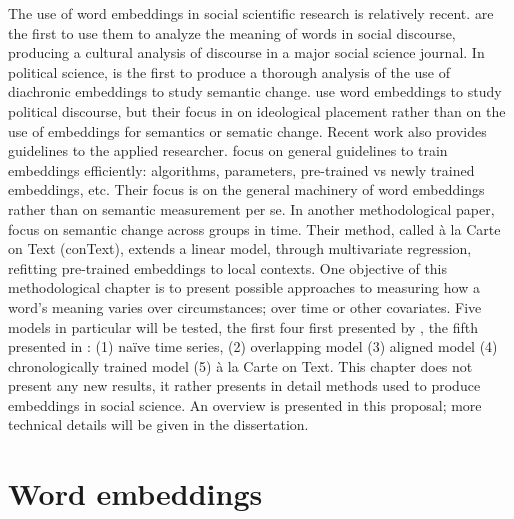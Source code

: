 \documentclass[
  openany]{book}
\begin{document}
The use of word embeddings in social scientific research is relatively recent. \citet{kozlowski2019geometry} are the first to use them to analyze the meaning of words in social discourse, producing a cultural analysis of discourse in a major social science journal. In political science, \citet{rodman2020timely} is the first to produce a thorough analysis of the use of diachronic embeddings to study semantic change. \citet{rheault2020word} use word embeddings to study political discourse, but their focus in on ideological placement rather than on the use of embeddings for semantics or sematic change. Recent work also provides guidelines to the applied researcher. \citet{rodriguez2021word} focus on general guidelines to train embeddings efficiently: algorithms, parameters, pre-trained vs newly trained embeddings, etc. Their focus is on the general machinery of word embeddings rather than on semantic measurement per se. In another methodological paper, \citet{rodriguez2021embedding} focus on semantic change across groups in time. Their method, called à la Carte on Text (conText), extends a linear model, through multivariate regression, refitting pre-trained embeddings to local contexts. One objective of this methodological chapter is to present possible approaches to measuring how a word's meaning varies over circumstances; over time or other covariates. Five models in particular will be tested, the first four first presented by \citet{rodman2020timely}, the fifth presented in \citet{rodriguez2021embedding}: (1) naïve time series, (2) overlapping model (3) aligned model (4) chronologically trained model (5) à la Carte on Text. This chapter does not present any new results, it rather presents in detail methods used to produce embeddings in social science. An overview is presented in this proposal; more technical details will be given in the dissertation.

\hypertarget{word-embeddings}{%
\section{Word embeddings}\label{word-embeddings}}
\end{document}
